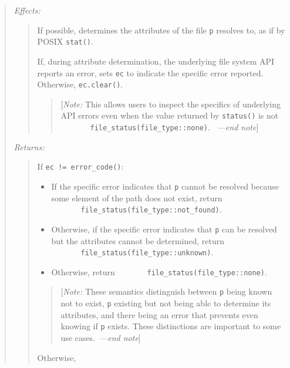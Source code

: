 \begin{quote}
\emph{Effects:}

\begin{quote}
If possible, determines the attributes of the file \texttt{p} resolves
to, as if by POSIX \texttt{stat()}.

If, during attribute determination, the underlying file system API
reports an error, sets \texttt{ec} to indicate the specific error
reported. Otherwise, \texttt{ec.clear()}.

\begin{quote}
{[}\emph{Note:} This allows users to inspect the specifics of underlying
API errors even when the value returned by \texttt{status()} is not
\texttt{\ \ \ \ \ \ \ file\_status(file\_type::none)}.~ \emph{---end
note}{]}
\end{quote}
\end{quote}

\emph{Returns:}

\begin{quote}
If \texttt{ec\ !=\ error\_code()}:

\begin{itemize}
\tightlist
\item
  If the specific error indicates that \texttt{p} cannot be resolved
  because some element of the path does not exist, return
  \texttt{\ \ \ \ \ \ \ file\_status(file\_type::not\_found)}.
\item
  Otherwise, if the specific error indicates that \texttt{p} can be
  resolved but the attributes cannot be determined, return
  \texttt{\ \ \ \ \ \ \ file\_status(file\_type::unknown)}.
\item
  Otherwise, return
  \texttt{\ \ \ \ \ \ \ file\_status(file\_type::none)}.
\end{itemize}

\begin{quote}
{[}\emph{Note:} These semantics distinguish between \texttt{p} being
known not to exist, \texttt{p} existing but not being able to determine
its attributes, and there being an error that prevents even knowing if
\texttt{p} exists. These distinctions are important to some use
cases.~\emph{---end note}{]}
\end{quote}

Otherwise,


\end{quote}
\end{quote}
